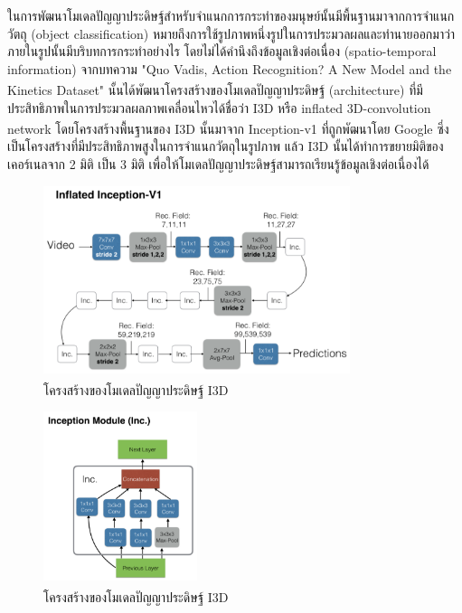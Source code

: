 ในการพัฒนาโมเดลปัญญาประดิษฐ์สำหรับจำแนกการกระทำของมนุษย์นั้นมีพื้นฐานมาจากการจำแนกวัตถุ (object classification)
หมายถึงการใช้รูปภาพหนึ่งรูปในการประมวลผลและทำนายออกมาว่าภายในรูปนั้นมีบริบทการกระทำอย่างไร โดยไม่ได้คำนึงถึงข้อมูลเชิงต่อเนื่อง (spatio-temporal information)
จากบทความ "Quo Vadis, Action Recognition? A New Model and the Kinetics Dataset"\textsuperscript{\cite{I3D}} นั้นได้พัฒนาโครงสร้างของโมเดลปัญญาประดิษฐ์ (architecture) 
ที่มีประสิทธิภาพในการประมวลผลภาพเคลื่อนไหวได้ชื่อว่า I3D หรือ inflated 3D-convolution network
โดยโครงสร้างพื้นฐานของ I3D นั้นมาจาก Inception-v1\textsuperscript{\cite{Inception}} ที่ถูกพัฒนาโดย Google ซึ่งเป็นโครงสร้างที่มีประสิทธิภาพสูงในการจำแนกวัตถุในรูปภาพ
แล้ว I3D นั้นได้ทำการขยายมิติของเคอร์เนลจาก 2 มิติ เป็น 3 มิติ เพื่อให้โมเดลปัญญาประดิษฐ์สามารถเรียนรู้ข้อมูลเชิงต่อเนื่องได้
\begin{figure}[!ht]
    \centering
    \includegraphics[width=0.8\textwidth]{chapter2/images/I3D.png}
    \caption{โครงสร้างของโมเดลปัญญาประดิษฐ์ I3D\textsuperscript{\cite{I3D}}}
    \label{fig:I3DArch}
\end{figure}
\begin{figure}[!ht]
    \centering
    \includegraphics[width=0.4\textwidth]{chapter2/images/inceptionModule.png}
    \caption{โครงสร้างของโมเดลปัญญาประดิษฐ์ I3D\textsuperscript{\cite{I3D}}}
    \label{fig:InceptionModule}
\end{figure}
